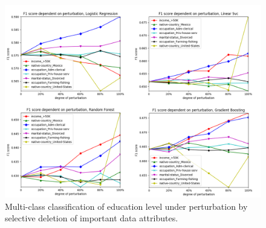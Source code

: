 \documentclass{llncs}
\begin{document}



\begin{figure}[!h]
	\centering
	\includegraphics[width=1\textwidth]{figures/perturbation/adults_education_num/perturb_education_combined}
	\caption{Multi-class classification of education level under perturbation by selective deletion of important data attributes.}
	\label{fig:results_perturbation_education_num}
\end{figure}
\end{document}
